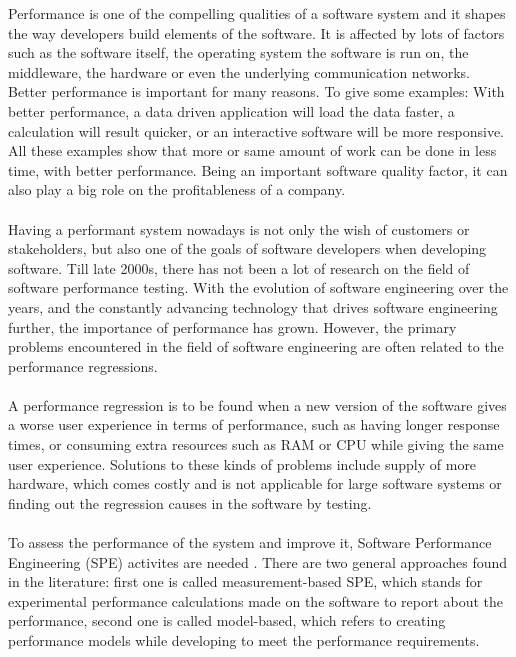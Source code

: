 \documentclass{seal_thesis}
\begin{document}
Performance is one of the compelling qualities of a software system \cite{Woodside:2007:FSP:1253532.1254717} and it shapes the way developers build elements of the software. It is affected by lots of factors such as the software itself, the operating system the software is run on, the middleware, the hardware or even the underlying communication networks\cite{Woodside:2007:FSP:1253532.1254717}. Better performance is important for many reasons. To give some examples: With better performance, a data driven application  will load the data faster, a calculation will result quicker, or an interactive software will be more responsive. All these examples show that more or same amount of work can be done in less time, with better performance. Being an important software quality factor, it can also play a big role on the profitableness of a company\cite{Nguyen:2014:ICS:2597073.2597092}\cite{costa2019}.\\
\\
Having a performant system nowadays is not only the wish of customers or stakeholders, but also one of the goals of software developers when developing software. Till late 2000s, there has not been a lot of research on the field of software performance testing\cite{weyuker2000experience}. With the evolution of software engineering over the years, and the constantly advancing technology that drives software engineering further, the importance of performance has grown. However, the primary problems encountered in the field of software engineering are often related to the performance regressions\cite{weyuker2000experience}.\\
\\
A performance regression is to be found when a new version of the software gives a worse user experience in terms of performance, such as having longer response times, or consuming extra resources such as RAM or CPU while giving the same user experience\cite{Nguyen:2014:ICS:2597073.2597092}. Solutions to these kinds of problems include supply of more hardware, which comes costly and is not applicable for large software systems \cite{Nguyen:2014:ICS:2597073.2597092} or finding out the regression causes in the software by testing.\\
\\
To assess the performance of the system and improve it, Software Performance Engineering (SPE) activites are needed \cite{Woodside:2007:FSP:1253532.1254717}. There are two general approaches found in the literature: first one is called measurement-based SPE, which stands for experimental performance calculations made on the software to report about the performance, second one is called model-based, which refers to creating performance models while developing to meet the performance requirements\cite{Woodside:2007:FSP:1253532.1254717}. \\ 
\end{document}
